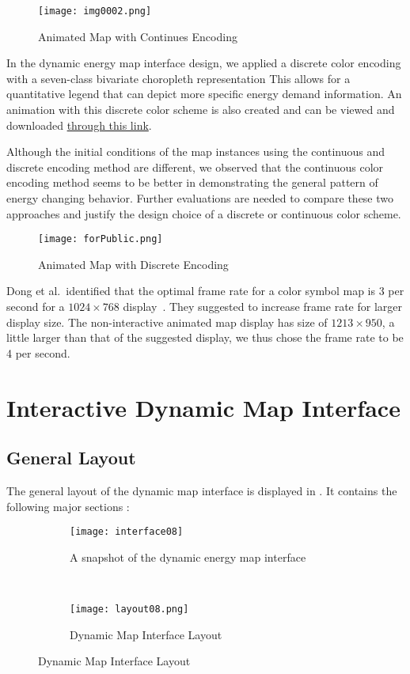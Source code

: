 \begin{figure}[h!]
  \centering
  \texttt{[image: img0002.png]}
  \caption[Animated Map with Continues Encoding]{Animated Map with
    Continues Encoding}
  \label{fig:anime0002}
\end{figure}

In the dynamic energy map interface design, we applied a discrete
color encoding with a seven-class bivariate choropleth representation
This allows for a quantitative legend that can depict more specific
energy demand information. An animation with this discrete color
scheme is also created and can be viewed and downloaded
\href{http://www.armechxyj.com/energy-mapping.html#redblueAnime3d}{through
  this link}. 

Although the initial conditions of the map instances using the
continuous and discrete encoding method are different, we observed
that the continuous color encoding method seems to be better in
demonstrating the general pattern of energy changing behavior. Further
evaluations are needed to compare these two approaches and justify the
design choice of a discrete or continuous color scheme.

\begin{figure}[h!]
  \centering
  \texttt{[image: forPublic.png]}
  \caption[Animated Map with Discrete Encoding]{Animated Map with
    Discrete Encoding}
  \label{fig:anime0002}
\end{figure}
Dong et al.\ identified that the optimal frame rate for a color symbol
map is 3 per second for a $1024 \times 768$
display~\cite{doi:10.1559/1523040639298}. They suggested to increase
frame rate for larger display size. The non-interactive animated map
display has size of $1213 \times 950$, a little larger than that of
the suggested display, we thus chose the frame rate to be 4 per
second.

\section{Interactive Dynamic Map Interface}
\subsection{General Layout}
The general layout of the dynamic map interface is displayed in
. It contains the following major sections :
\begin{figure}[h!]
  \centering
  \begin{subfigure}{0.7\textwidth}
  \centering
  \texttt{[image: interface08]}
  \caption[Dynamic Energy Map Interface Snapshot]{A snapshot of the dynamic energy map interface}
  \label{fig:interface08}
\end{subfigure}
~
\begin{subfigure}{0.7\textwidth}
  \centering
  \texttt{[image: layout08.png]}
  \caption[Dynamic Energy Map Interface Layout]{Dynamic Map Interface Layout}
  \label{fig:layout08}
\end{subfigure}
\caption{Dynamic Map Interface Layout}
\label{fig:interfaceLayout}
\end{figure}

